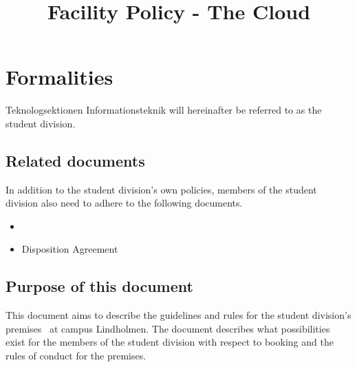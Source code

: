 \documentclass[11pt, includeaddress]{classes/cthit_en}
\begin{document}
\title{Facility Policy - The Cloud}
\maketitle

\thispagestyle{empty}

\newpage

\makeheadfoot%

\setcounter{tocdepth}{2}
\setcounter{page}{1}
\tableofcontents

\newpage



\section{Formalities}
Teknologsektionen Informationsteknik will hereinafter be referred to as the student division.

\subsection{Related documents}
In addition to the student division's own policies, members of the student division also need to adhere to the following documents.
\begin{itemize}
    \item {}
    \item Disposition Agreement
\end{itemize}

\subsection{Purpose of this document}
This document aims to describe the guidelines and rules for the student division's premises \THECLOUD\ at campus Lindholmen.
The document describes what possibilities exist for the members of the student division with respect to booking and the rules of conduct for the premises.
\end{document}
